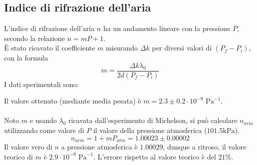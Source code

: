 \subsection{Indice di rifrazione dell'aria}
L'indice di rifrazione dell'aria $n$ ha un andamento lineare con la pressione $P$, secondo la relazione $n = mP+1$.\\
%
È stato ricavato il coefficiente $m$ misurando $\Delta k$ per diversi valori di $(P_f-P_i)$, con la formula
%
    $$ m = \frac{\Delta k  \lambda_0}{2d(P_f-P_i)} $$
%
I dati sperimentali sono:
%

%
Il valore ottenuto (mediante media pesata) è $ m = 2.3 \pm 0.2 \cdot10^{-9}$ $\mathrm{Pa}^{-1}$.\\\\
%
Noto $m$ e usando $\lambda_0$ ricavata dall'esperimento di Michelson, si può calcolare $n_{aria}$ utilizzando come valore di $P$ il valore della pressione atmosferica ($101.5 \mathrm{kPa}$).
    $$ n_{aria} = 1+mP_{atm} =  1.00023 \pm 0.00002 $$ 
%
%
Il valore vero di $n$ a pressione atmosferica è $1.00029$, dunque a ritroso, il valore teorico di $m$ è $ 2.9 \cdot10^{-9}$ $\mathrm{Pa}^{-1}$. L'errore rispetto al valore teorico è del $21\%$.